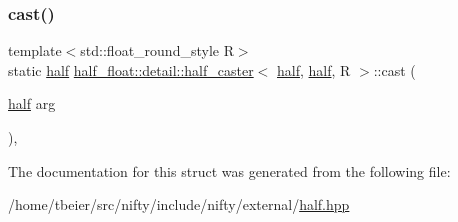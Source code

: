 \subsubsection{\texorpdfstring{cast()}{cast()}}
{\footnotesize\ttfamily template$<$std\+::float\+\_\+round\+\_\+style R$>$ \\
static \hyperlink{classhalf__float_1_1half}{half} \hyperlink{structhalf__float_1_1detail_1_1half__caster}{half\+\_\+float\+::detail\+::half\+\_\+caster}$<$ \hyperlink{classhalf__float_1_1half}{half}, \hyperlink{classhalf__float_1_1half}{half}, R $>$\+::cast (\begin{DoxyParamCaption}\item[{\hyperlink{classhalf__float_1_1half}{half}}]{arg }\end{DoxyParamCaption})\hspace{0.3cm}{\ttfamily [inline]}, {\ttfamily [static]}}



The documentation for this struct was generated from the following file\+:\begin{DoxyCompactItemize}
\item 
/home/tbeier/src/nifty/include/nifty/external/\hyperlink{half_8hpp}{half.\+hpp}\end{DoxyCompactItemize}
